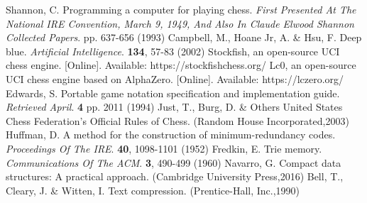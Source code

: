 \documentclass[journal]{journal}
\begin{document}




\ifCLASSOPTIONcaptionsoff
  \newpage
\fi




%
% 
%
\begin{thebibliography}{1}

Shannon, C. Programming a computer for playing chess. {\em First Presented At The National IRE Convention, March 9, 1949, And Also In Claude Elwood Shannon Collected Papers}. pp. 637-656 (1993)
Campbell, M., Hoane Jr, A. \& Hsu, F. Deep blue. {\em Artificial Intelligence}. \textbf{134}, 57-83 (2002)
 Stockfish, an open-source UCI chess engine. [Online]. Available: https://stockfishchess.org/  
 Lc0, an open-source UCI chess engine based on AlphaZero. [Online]. Available: https://lczero.org/  
Edwards, S. Portable game notation specification and implementation guide. {\em Retrieved April}. \textbf{4} pp. 2011 (1994)
Just, T., Burg, D. \& Others United States Chess Federation's Official Rules of Chess. (Random House Incorporated,2003)
Huffman, D. A method for the construction of minimum-redundancy codes. {\em Proceedings Of The IRE}. \textbf{40}, 1098-1101 (1952)
Fredkin, E. Trie memory. {\em Communications Of The ACM}. \textbf{3}, 490-499 (1960)
Navarro, G. Compact data structures: A practical approach. (Cambridge University Press,2016)
Bell, T., Cleary, J. \& Witten, I. Text compression. (Prentice-Hall, Inc.,1990)


\end{thebibliography}
\end{document}
